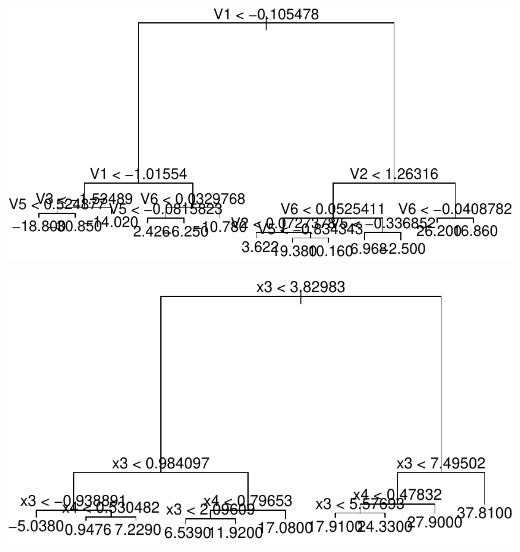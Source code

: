 \documentclass[12pt,twoside]{reedthesis}
\begin{document}
  \begin{Shaded}
  \begin{Highlighting}[]
  \StringTok{ }
  \StringTok{ }
  \StringTok{ }
  
  \end{Highlighting}
  \end{Shaded}
  
  \begin{center}\includegraphics{Thesis_files/figure-latex/unnamed-chunk-1-1} \end{center}
  
  \begin{Shaded}
  \begin{Highlighting}[]
  \end{Highlighting}
  \end{Shaded}
  
  \begin{center}\includegraphics{Thesis_files/figure-latex/unnamed-chunk-1-2} \end{center}
  
\end{document}
